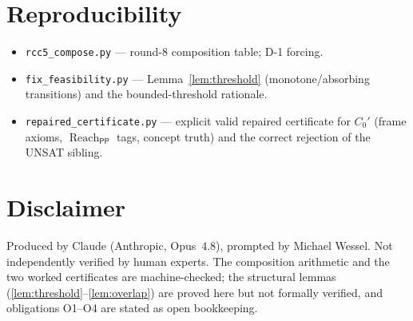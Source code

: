 \documentclass[11pt]{article}
\newcommand{\PP}{\mathsf{PP}}
\newcommand{\reach}{\operatorname{Reach}}
\begin{document}
\section*{Reproducibility}

\begin{itemize}
\item \texttt{rcc5\_compose.py} --- round-8 composition table; D-1 forcing.
\item \texttt{fix\_feasibility.py} --- Lemma~\ref{lem:threshold}
(monotone/absorbing transitions) and the bounded-threshold rationale.
\item \texttt{repaired\_certificate.py} --- explicit valid repaired certificate
for $C_0'$ (frame axioms, $\reach_\PP$ tags, concept truth) and the
correct rejection of the UNSAT sibling.
\end{itemize}

\section*{Disclaimer}

Produced by Claude (Anthropic, Opus~4.8), prompted by Michael Wessel.  Not
independently verified by human experts.  The composition arithmetic and the two
worked certificates are machine-checked; the structural lemmas
(\ref{lem:threshold}--\ref{lem:overlap}) are proved here but not formally
verified, and obligations O1--O4 are stated as open bookkeeping.
\end{document}
